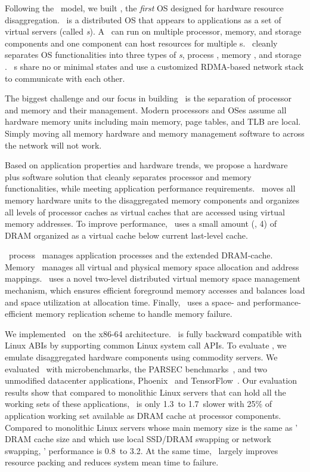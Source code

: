 Following the \splitkernel\ model, 
we built \lego, the {\em first} OS designed for hardware resource disaggregation.
\lego\ is a distributed OS that appears to applications as a set of virtual servers (called {\em \vnode{}s}).
A \vnode\ can run on multiple processor, memory, and storage components
and one component can host resources for multiple \vnode{}s.
\lego\ cleanly separates OS functionalities into %
three types of {\em \microos{}s},
process \microos, memory \microos, and storage \microos. %
\lego\ \microos{}s share no or minimal states
and use a customized RDMA-based network stack to communicate with each other.

The biggest challenge and our focus in building \lego\ is the separation of processor and memory and their management.
Modern processors and OSes assume all hardware memory units including main memory, page tables, and TLB are local.
Simply moving all memory hardware and memory management software to across the network will not work.

Based on application properties and hardware trends, 
we propose a hardware plus software solution that cleanly separates processor and memory functionalities,
while meeting application performance requirements.
\lego\ moves all memory hardware units to the disaggregated memory components
and organizes all levels of processor caches as virtual caches that are accessed using virtual memory addresses. 
To improve performance, \lego\ uses a small amount (\eg, 4\GB) of DRAM
organized as a virtual cache below current last-level cache.

\lego\ process \microos\ manages application processes and the extended DRAM-cache.
Memory \microos\ manages all virtual and physical memory space allocation and address mappings. 
\lego\ uses a novel two-level distributed virtual memory space management mechanism,
which ensures efficient foreground memory accesses and balances load and space utilization at allocation time.
Finally, \lego\ uses a space- and performance-efficient memory replication scheme to handle memory failure.

We implemented \lego\ on the x86-64 architecture.
\lego\ is fully backward compatible with Linux ABIs
by supporting common Linux system call APIs.
To evaluate \lego, we emulate disaggregated hardware components using commodity servers.
We evaluated \lego\ with microbenchmarks, the PARSEC benchmarks~\cite{PARSEC}, %
and two unmodified datacenter applications, Phoenix~\cite{Ranger07-HPCA}
and TensorFlow~\cite{TensorFlow}.
Our evaluation results show that compared to monolithic Linux servers that can hold all the working sets of these applications,
\lego\ is only 1.3\x\ to 1.7\x\ slower with 25\% of application working set available as DRAM cache at processor components.
Compared to monolithic Linux servers whose main memory size is the same as \lego' DRAM cache size
and which use local SSD/DRAM swapping or network swapping,
\lego' performance is 0.8\x\ to 3.2\x.
At the same time, \lego\ largely improves resource packing %
and reduces system mean time to failure. %

